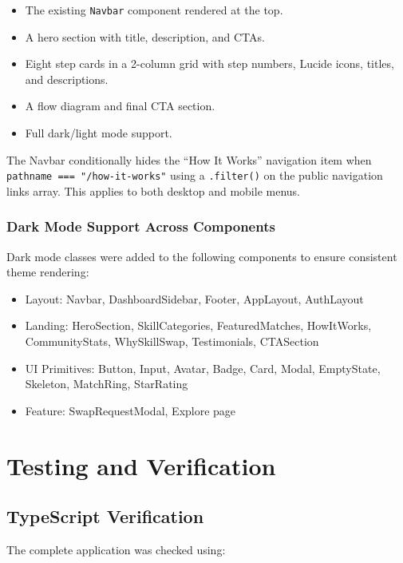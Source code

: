 \documentclass[12pt,a4paper]{report}
\begin{document}
\begin{itemize}[noitemsep]
  \item The existing \texttt{Navbar} component rendered at the top.
  \item A hero section with title, description, and CTAs.
  \item Eight step cards in a 2-column grid with step numbers, Lucide icons,
        titles, and descriptions.
  \item A flow diagram and final CTA section.
  \item Full dark/light mode support.
\end{itemize}

The Navbar conditionally hides the ``How It Works'' navigation item when
\texttt{pathname === "/how-it-works"} using a \texttt{.filter()} on the public
navigation links array.  This applies to both desktop and mobile menus.

\subsection{Dark Mode Support Across Components}
Dark mode classes were added to the following components to ensure consistent
theme rendering:

\begin{itemize}[noitemsep]
  \item Layout: Navbar, DashboardSidebar, Footer, AppLayout, AuthLayout
  \item Landing: HeroSection, SkillCategories, FeaturedMatches, HowItWorks,
        CommunityStats, WhySkillSwap, Testimonials, CTASection
  \item UI Primitives: Button, Input, Avatar, Badge, Card, Modal, EmptyState,
        Skeleton, MatchRing, StarRating
  \item Feature: SwapRequestModal, Explore page
\end{itemize}

\chapter{Testing and Verification}

\section{TypeScript Verification}
The complete application was checked using:
\end{document}
